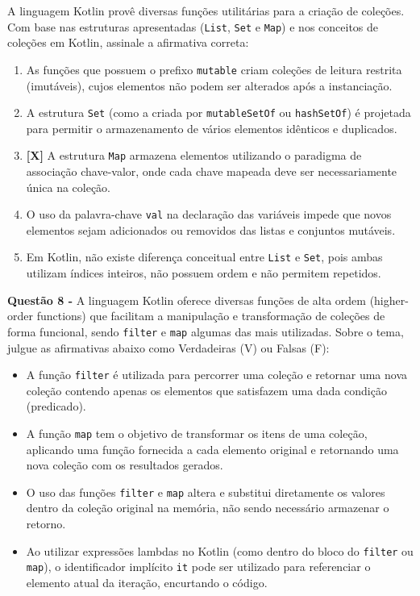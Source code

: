 \documentclass[12pt,a4paper]{article}
\begin{document}
A linguagem Kotlin provê diversas funções utilitárias para a criação de coleções. Com base nas estruturas apresentadas (\texttt{List}, \texttt{Set} e \texttt{Map}) e nos conceitos de coleções em Kotlin, assinale a afirmativa correta:

\begin{enumerate}[label=\alph*)]
    \item As funções que possuem o prefixo \texttt{mutable} criam coleções de leitura restrita (imutáveis), cujos elementos não podem ser alterados após a instanciação.
    \item A estrutura \texttt{Set} (como a criada por \texttt{mutableSetOf} ou \texttt{hashSetOf}) é projetada para permitir o armazenamento de vários elementos idênticos e duplicados.
    \item \textbf{[X]} A estrutura \texttt{Map} armazena elementos utilizando o paradigma de associação chave-valor, onde cada chave mapeada deve ser necessariamente única na coleção.
    \item O uso da palavra-chave \texttt{val} na declaração das variáveis impede que novos elementos sejam adicionados ou removidos das listas e conjuntos mutáveis.
    \item Em Kotlin, não existe diferença conceitual entre \texttt{List} e \texttt{Set}, pois ambas utilizam índices inteiros, não possuem ordem e não permitem repetidos.
\end{enumerate}

\vspace{0.5cm}

\textbf{Questão 8 - } A linguagem Kotlin oferece diversas funções de alta ordem (higher-order functions) que facilitam a manipulação e transformação de coleções de forma funcional, sendo \texttt{filter} e \texttt{map} algumas das mais utilizadas. Sobre o tema, julgue as afirmativas abaixo como Verdadeiras (V) ou Falsas (F):

\begin{itemize}[label={(\ \ \ )}]
    \item[( V )] A função \texttt{filter} é utilizada para percorrer uma coleção e retornar uma nova coleção contendo apenas os elementos que satisfazem uma dada condição (predicado).
    \item[( V )] A função \texttt{map} tem o objetivo de transformar os itens de uma coleção, aplicando uma função fornecida a cada elemento original e retornando uma nova coleção com os resultados gerados.
    \item[( F )] O uso das funções \texttt{filter} e \texttt{map} altera e substitui diretamente os valores dentro da coleção original na memória, não sendo necessário armazenar o retorno.
    \item[( V )] Ao utilizar expressões lambdas no Kotlin (como dentro do bloco do \texttt{filter} ou \texttt{map}), o identificador implícito \texttt{it} pode ser utilizado para referenciar o elemento atual da iteração, encurtando o código.
\end{itemize}
\end{document}
